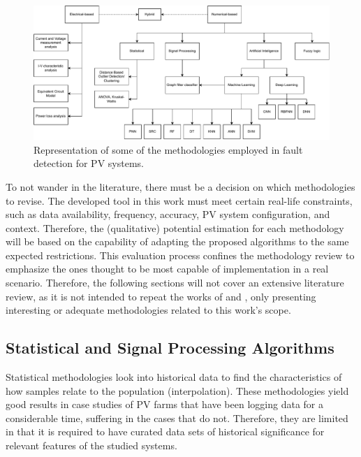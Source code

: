 \begin{figure}[h]
    \centering
    \includegraphics[width=15cm]{figures/chapter2/techniques.drawio.pdf} \caption{Representation of some of the methodologies employed in fault detection for PV systems.}
    \label{fig:techniques}
\end{figure}

To not wander in the literature, there must be a decision on which methodologies to revise. The developed tool in this work must meet certain real-life constraints, such as data availability, frequency, accuracy, PV system configuration, and context. Therefore, the (qualitative) potential estimation for each methodology will be based on the capability of adapting the proposed algorithms to the same expected restrictions. This evaluation process confines the methodology review to emphasize the ones thought to be most capable of implementation in a real scenario. Therefore, the following sections will not cover an extensive literature review, as it is not intended to repeat the works of \cite{Hong2022} and \cite{Livera2019}, only presenting interesting or adequate methodologies related to this work's scope.


\subsection{Statistical and Signal Processing Algorithms}

Statistical methodologies look into historical data to find the characteristics of how samples relate to the population (interpolation). These methodologies yield good results in case studies of PV farms that have been logging data for a considerable time, suffering in the cases that do not. Therefore, they are limited in that it is required to have curated data sets of historical significance for relevant features of the studied systems.


